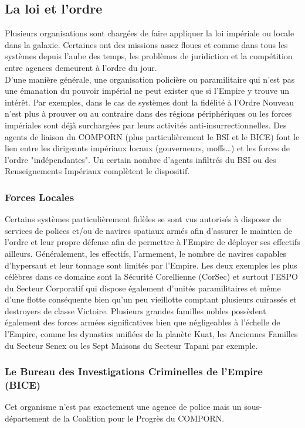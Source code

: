 \documentclass[twoside]{article}
\begin{document}
\subsection{La loi et l’ordre}
Plusieurs organisations sont chargées de faire appliquer la loi impériale ou locale dans la galaxie. Certaines ont des missions assez floues et comme dans tous les systèmes depuis l'aube des temps, les problèmes de juridiction et la compétition entre agences demeurent à l'ordre du jour.\\

D'une manière générale, une organisation policière ou paramilitaire qui n'est pas une émanation du pouvoir impérial ne peut exister que si l'Empire y trouve un intérêt. Par exemples, dans le cas de systèmes dont la fidélité à l'Ordre Nouveau n'est plus à prouver ou au contraire dans des régions périphériques ou les forces impériales sont déjà surchargées par leurs activités anti-insurrectionnelles. Des agents de liaison du COMPORN (plus particulièrement le BSI et le BICE) font le lien entre les dirigeants impériaux locaux (gouverneurs, moffs\ldots) et les forces de l'ordre "indépendantes". Un certain nombre d'agents infiltrés du BSI ou des Renseignements Impériaux complètent le dispositif.

\subsubsection{Forces Locales}
Certains systèmes particulièrement fidèles se sont vus autorisés à disposer de services de polices et/ou de  navires spatiaux armés afin d'assurer le maintien de l'ordre et leur propre défense afin de permettre à l'Empire de déployer ses effectifs ailleurs. Généralement, les effectifs, l'armement, le nombre de navires capables d'hypersaut et leur tonnage sont limités par l'Empire. Les deux exemples les plus célèbres dans ce domaine sont la Sécurité Corellienne (CorSec) et surtout l'ESPO du Secteur Corporatif qui dispose également d'unités paramilitaires et même d'une flotte conséquente bien qu'un peu vieillotte comptant plusieurs cuirassés et destroyers de classe Victoire. Plusieurs grandes familles nobles possèdent également des forces armées significatives bien que négligeables à l'échelle de l'Empire, comme les dynasties unifiées de la planète Kuat, les Anciennes Familles du Secteur Senex ou les Sept Maisons du Secteur Tapani par exemple.


\subsubsection{Le Bureau des Investigations Criminelles de l'Empire (BICE)}
Cet organisme n'est pas exactement une agence de police mais un sous-département de la Coalition pour le Progrès du COMPORN.\\
\end{document}
